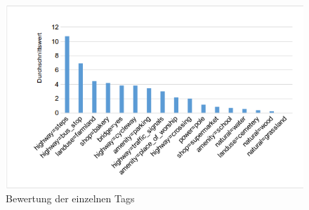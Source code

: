 \begin{figure}[H]
\begin{center}
\includegraphics[width=150mm]{images/ch6_img07_result1.png}
\caption{Bewertung der einzelnen Tags}
\label{img:ch6_img07_result1}
\end{center}
\end{figure}
